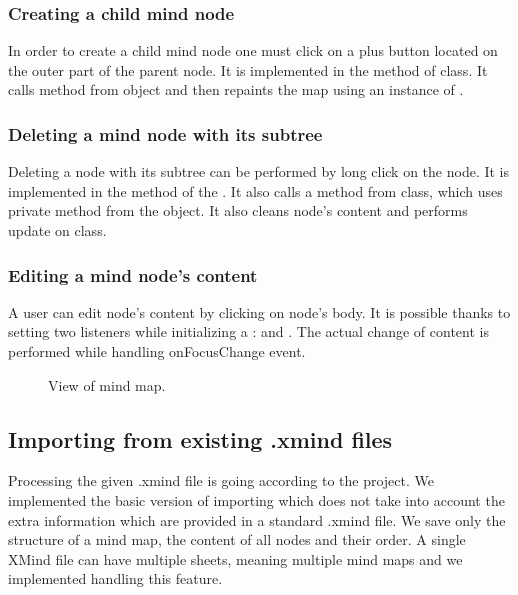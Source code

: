\subsubsection{Creating a child mind node}
\label{subsubsec:create-child}
In order to create a child mind node one must click on a plus button located on the outer part of the parent node. It is implemented in the  method of  class. It calls  method from  object and then repaints the map using an instance of .

\subsubsection{Deleting a mind node with its subtree}
\label{subsubsec:delete-node}
 Deleting a node with its subtree can be performed by long click on the node. It is implemented in the  method of the . It also calls a  method from  class, which uses  private method from the  object. It also cleans node's content and performs update on  class. 
 
\subsubsection{Editing a mind node's content}
\label{subsubsec:delete-node}
A user can edit node's content by clicking on node's body. It is possible thanks to setting two listeners while initializing a :  and . The actual change of content is performed while handling onFocusChange event.

\begin{figure}[h]
	\centering
	\caption{View of mind map.}
	\label{fig:screen-map}
\end{figure}

\subsection{Importing from existing .xmind files}
\label{subsec:import}
Processing the given .xmind file is going according to the project. We implemented the basic version of importing which does not take into account the extra information which are provided in a standard .xmind file. We save only the structure of a mind map, the content of all nodes and their order. A single XMind file can have multiple sheets, meaning multiple mind maps and we implemented handling this feature. 

